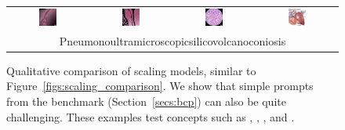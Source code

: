 \begin{figure}[ht!]
\begin{tabular}{cccc}
        \includegraphics[width=0.24\textwidth]{figures/scaling_comparison/med_0.jpg} &
        \includegraphics[width=0.24\textwidth]{figures/scaling_comparison/med_1.jpg} &
        \includegraphics[width=0.24\textwidth]{figures/scaling_comparison/med_2.jpg} &
        \includegraphics[width=0.24\textwidth]{figures/scaling_comparison/med_3.jpg}\vspace{1mm} \\
        \multicolumn{4}{c}{\small Pneumonoultramicroscopicsilicovolcanoconiosis} \\
    \end{tabular} 
    \caption{Qualitative comparison of scaling \bdraw models, similar to Figure~\ref{figs:scaling_comparison}. We show that simple prompts from the \bcpa{} benchmark (Section~\ref{secs:bcp}) can also be quite challenging. These examples test concepts such as , , , and .}
    \vspace{-0.15in}
    \label{figs:scaling_bcp}
\end{figure}
